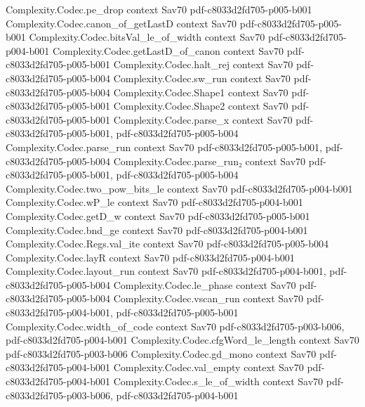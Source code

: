 \begin{theorem}
  {Complexity.Codec.pe_drop}
  {context}
  {Sav70}
  {pdf-c8033d2fd705-p005-b001}
\proofstep
  {Complexity.Codec.canon_of_getLastD}
  {context}
  {Sav70}
  {pdf-c8033d2fd705-p005-b001}
\proofstep
  {Complexity.Codec.bitsVal_le_of_width}
  {context}
  {Sav70}
  {pdf-c8033d2fd705-p004-b001}
\proofstep
  {Complexity.Codec.getLastD_of_canon}
  {context}
  {Sav70}
  {pdf-c8033d2fd705-p005-b001}
\proofstep
  {Complexity.Codec.halt_rej}
  {context}
  {Sav70}
  {pdf-c8033d2fd705-p005-b004}
\proofstep
  {Complexity.Codec.sw_run}
  {context}
  {Sav70}
  {pdf-c8033d2fd705-p005-b004}
\proofstep
  {Complexity.Codec.Shape1}
  {context}
  {Sav70}
  {pdf-c8033d2fd705-p005-b001}
\proofstep
  {Complexity.Codec.Shape2}
  {context}
  {Sav70}
  {pdf-c8033d2fd705-p005-b001}
\proofstep
  {Complexity.Codec.parse_x}
  {context}
  {Sav70}
  {pdf-c8033d2fd705-p005-b001,
    pdf-c8033d2fd705-p005-b004}
\proofstep
  {Complexity.Codec.parse_run}
  {context}
  {Sav70}
  {pdf-c8033d2fd705-p005-b001,
    pdf-c8033d2fd705-p005-b004}
\proofstep
  {Complexity.Codec.parse_run₂}
  {context}
  {Sav70}
  {pdf-c8033d2fd705-p005-b001,
    pdf-c8033d2fd705-p005-b004}
\proofstep
  {Complexity.Codec.two_pow_bits_le}
  {context}
  {Sav70}
  {pdf-c8033d2fd705-p004-b001}
\proofstep
  {Complexity.Codec.wP_le}
  {context}
  {Sav70}
  {pdf-c8033d2fd705-p004-b001}
\proofstep
  {Complexity.Codec.getD_w}
  {context}
  {Sav70}
  {pdf-c8033d2fd705-p005-b001}
\proofstep
  {Complexity.Codec.bnd_ge}
  {context}
  {Sav70}
  {pdf-c8033d2fd705-p004-b001}
\proofstep
  {Complexity.Codec.Regs.val_ite}
  {context}
  {Sav70}
  {pdf-c8033d2fd705-p005-b004}
\proofstep
  {Complexity.Codec.layR}
  {context}
  {Sav70}
  {pdf-c8033d2fd705-p004-b001}
\proofstep
  {Complexity.Codec.layout_run}
  {context}
  {Sav70}
  {pdf-c8033d2fd705-p004-b001,
    pdf-c8033d2fd705-p005-b004}
\proofstep
  {Complexity.Codec.le_phase}
  {context}
  {Sav70}
  {pdf-c8033d2fd705-p005-b004}
\proofstep
  {Complexity.Codec.vscan_run}
  {context}
  {Sav70}
  {pdf-c8033d2fd705-p004-b001,
    pdf-c8033d2fd705-p005-b001}
\proofstep
  {Complexity.Codec.width_of_code}
  {context}
  {Sav70}
  {pdf-c8033d2fd705-p003-b006,
    pdf-c8033d2fd705-p004-b001}
\proofstep
  {Complexity.Codec.cfgWord_le_length}
  {context}
  {Sav70}
  {pdf-c8033d2fd705-p003-b006}
\proofstep
  {Complexity.Codec.gd_mono}
  {context}
  {Sav70}
  {pdf-c8033d2fd705-p004-b001}
\proofstep
  {Complexity.Codec.val_empty}
  {context}
  {Sav70}
  {pdf-c8033d2fd705-p004-b001}
\proofstep
  {Complexity.Codec.s_le_of_width}
  {context}
  {Sav70}
  {pdf-c8033d2fd705-p003-b006,
    pdf-c8033d2fd705-p004-b001}

\end{theorem}
